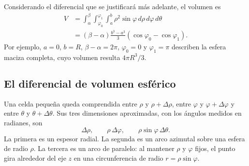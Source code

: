 \begin{center}
\end{center}
\endgroup

Considerando el diferencial que se justificará más adelante, el volumen es
\begin{align*}
V&=\int_\alpha^\beta\int_{\varphi_0}^{\varphi_1}\int_a^b
\rho^2\sin\varphi\,d\rho\,d\varphi\,d\theta\\
&=(\beta-\alpha)\frac{b^3-a^3}{3}
(\cos\varphi_0-\cos\varphi_1).
\end{align*}
Por ejemplo, $a=0$, $b=R$, $\beta-\alpha=2\pi$, $\varphi_0=0$ y $\varphi_1=\pi$ describen la esfera maciza completa, cuyo volumen resulta $4\pi R^3/3$.

\subsection{El diferencial de volumen esférico}

Una celda pequeña queda comprendida entre $\rho$ y $\rho+\Delta\rho$, entre $\varphi$ y $\varphi+\Delta\varphi$ y entre $\theta$ y $\theta+\Delta\theta$. Sus tres dimensiones aproximadas, con los ángulos medidos en radianes, son
\[
\Delta\rho,\qquad \rho\,\Delta\varphi,\qquad
\rho\sin\varphi\,\Delta\theta.
\]
La primera es un espesor radial. La segunda es un arco azimutal sobre una esfera de radio $\rho$. La tercera es un arco de paralelo: al mantener $\rho$ y $\varphi$ fijos, el punto gira alrededor del eje $z$ en una circunferencia de radio $r=\rho\sin\varphi$.

